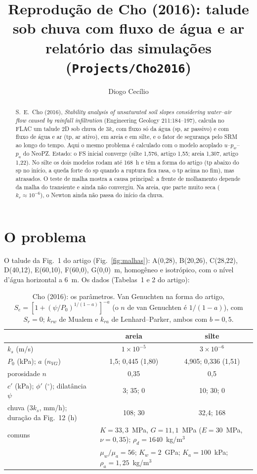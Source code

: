 \documentclass[11pt,a4paper]{article}
\title{Reprodução de Cho (2016): talude sob chuva com fluxo de água e ar\\
\large relatório das simulações (\texttt{Projects/Cho2016})}
\author{Diogo Cecílio}
\date{\versao}
\begin{document}
\maketitle

\begin{abstract}
S.~E.~Cho (2016), \emph{Stability analysis of unsaturated soil slopes considering water--air flow caused by rainfall
infiltration} (Engineering Geology 211:184--197), calcula no FLAC um talude 2D sob chuva de $3k_s$ com fluxo só da água
(sp, ar passivo) e com fluxo de água e ar (tp, ar ativo), em areia e em silte, e o fator de segurança pelo SRM ao longo do
tempo. Aqui o mesmo problema é calculado com o modelo acoplado $u$--$p_w$--$p_a$ do NeoPZ. Estado: o FS inicial
converge (silte 1,576, artigo 1,55; areia 1,307, artigo 1,22). No silte os dois modelos rodam até 168~h e têm a
forma do artigo (tp abaixo do sp no início, a queda forte do sp quando a ruptura fica rasa, o tp acima no fim), mas
atrasados. O teste de malha mostra a causa principal: a frente de molhamento depende da malha do transiente e ainda não
convergiu. Na areia, que parte muito seca ($k_r \approx 10^{-6}$), o Newton ainda não passa do início da chuva.
\end{abstract}

\tableofcontents

\section{O problema}
O talude da Fig.~1 do artigo (Fig.~\ref{fig:malhas}): A(0,28), B(20,26), C(28,22), D(40,12), E(60,10), F(60,0),
G(0,0)~m, homogêneo e isotrópico, com o nível d'água horizontal a 6~m. Os dados (Tabelas~1 e 2 do artigo):

\begin{table}[H]\centering\small
\caption{Cho (2016): os parâmetros. Van Genuchten na forma do artigo, $S_e = [1 + (\psi/P_0)^{1/(1-a)}]^{-a}$ (o $n$
de van Genuchten é $1/(1-a)$), com $S_r = 0$; $k_{rw}$ de Mualem e $k_{ra}$ de Lenhard--Parker, ambos com $b = 0{,}5$.}
\begin{tabular}{lcc}
\toprule
 & areia & silte\\
\midrule
$k_s$ (m/s) & $1\times10^{-5}$ & $3\times10^{-6}$\\
$P_0$ (kPa); $a$ ($n_{VG}$) & 1,5; 0,445 (1,80) & 4,905; 0,336 (1,51)\\
porosidade $n$ & 0,35 & 0,5\\
$c'$ (kPa); $\phi'$ ($^\circ$); dilatância $\psi$ & 3; 35; 0 & 10; 30; 0\\
chuva ($3k_s$, mm/h); duração da Fig.~12 (h) & 108; 30 & 32,4; 168\\
\midrule
comuns & \multicolumn{2}{l}{$K = 33{,}3$~MPa, $G = 11{,}1$~MPa ($E = 30$~MPa, $\nu = 0{,}35$); $\rho_d = 1640$~kg/m$^3$}\\
 & \multicolumn{2}{l}{$\mu_w/\mu_a = 56$; $K_w = 2$~GPa; $K_a = 100$~kPa; $\rho_a = 1{,}25$~kg/m$^3$}\\
\bottomrule
\end{tabular}
\end{table}
\end{document}
